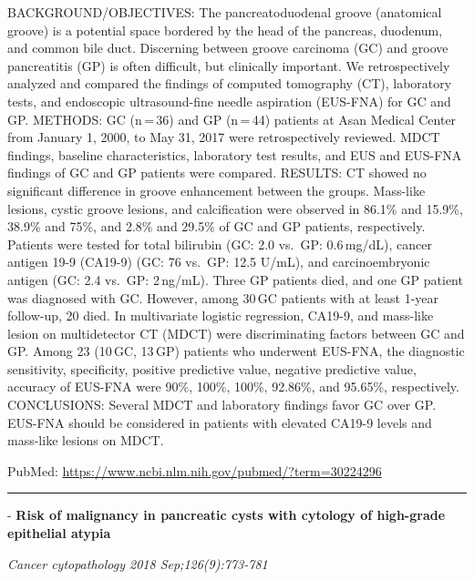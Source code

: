 \documentclass[]{article}
\begin{document}
BACKGROUND/OBJECTIVES: The pancreatoduodenal groove (anatomical groove)
is a potential space bordered by the head of the pancreas, duodenum, and
common bile duct. Discerning between groove carcinoma (GC) and groove
pancreatitis (GP) is often difficult, but clinically important. We
retrospectively analyzed and compared the findings of computed
tomography (CT), laboratory tests, and endoscopic ultrasound-fine needle
aspiration (EUS-FNA) for GC and GP. METHODS: GC (n\,=\,36) and GP
(n\,=\,44) patients at Asan Medical Center from January 1, 2000, to May
31, 2017 were retrospectively reviewed. MDCT findings, baseline
characteristics, laboratory test results, and EUS and EUS-FNA findings
of GC and GP patients were compared. RESULTS: CT showed no significant
difference in groove enhancement between the groups. Mass-like lesions,
cystic groove lesions, and calcification were observed in 86.1\% and
15.9\%, 38.9\% and 75\%, and 2.8\% and 29.5\% of GC and GP patients,
respectively. Patients were tested for total bilirubin (GC: 2.0 vs.~GP:
0.6\,mg/dL), cancer antigen 19-9 (CA19-9) (GC: 76 vs.~GP: 12.5 U/mL),
and carcinoembryonic antigen (GC: 2.4 vs.~GP: 2\,ng/mL). Three GP
patients died, and one GP patient was diagnosed with GC. However, among
30\,GC patients with at least 1-year follow-up, 20 died. In multivariate
logistic regression, CA19-9, and mass-like lesion on multidetector CT
(MDCT) were discriminating factors between GC and GP. Among 23 (10\,GC,
13\,GP) patients who underwent EUS-FNA, the diagnostic sensitivity,
specificity, positive predictive value, negative predictive value,
accuracy of EUS-FNA were 90\%, 100\%, 100\%, 92.86\%, and 95.65\%,
respectively. CONCLUSIONS: Several MDCT and laboratory findings favor GC
over GP. EUS-FNA should be considered in patients with elevated CA19-9
levels and mass-like lesions on MDCT.

PubMed: \url{https://www.ncbi.nlm.nih.gov/pubmed/?term=30224296}

{}

{}

\begin{center}\rule{0.5\linewidth}{\linethickness}\end{center}

 - \textbf{Risk of malignancy in pancreatic cysts with cytology of
high-grade epithelial atypia}

\emph{Cancer cytopathology 2018 Sep;126(9):773-781}
\end{document}
